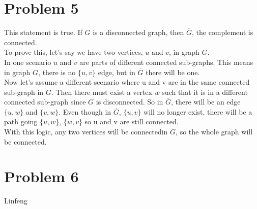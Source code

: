 \documentclass{article}
\begin{document}
\section*{Problem 5}
		
This statement is true. If $G$ is a disconnected graph, then $\overline{G}$, the complement is connected. \\

To prove this, let's say we have two vertices,  $u$ and $v$,  in graph $G$. \\

In one scenario $u$ and $v$ are parts of different connected sub-graphs. This means in graph $G$, there is no $\{u,v\}$ edge, but in $\overline{G}$ there will be one. \\

Now let's assume a different scenario where u and v are in the same connected sub-graph in $G$. Then there must exist a vertex $w$ such that it is in a different connected sub-graph since $G$ is disconnected.
So in $\overline{G}$, there will be an edge $\{u,w\}$ and $\{v,w\}$. Even though in $\overline{G}$, $\{u,v\}$ will no longer exist, there will be a path going $\{u,w\}$, $\{w,v\}$ so u and v are still connected. \\

With this logic, any two vertices will be connectedin $\overline{G}$, so the whole graph will be connected.

\section*{Problem 6}

Linfeng
\end{document}
